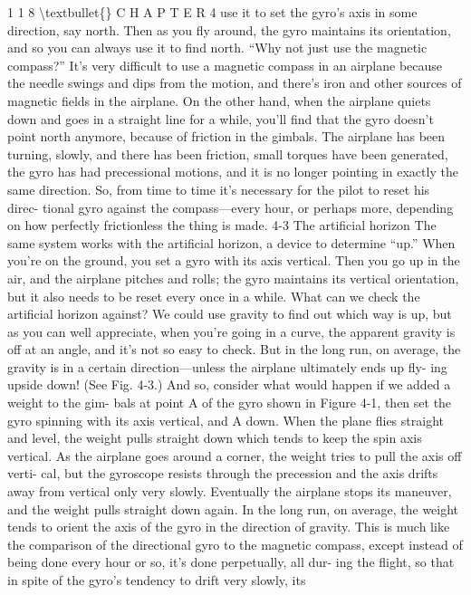\documentclass[10pt,oneside]{article}
\begin{document}
1 1 8 \textbackslash{}textbullet\{\} C H A P T E R  4 use it to set the gyro’s axis in some direction, say north. Then as you fly around, the gyro maintains its orientation, and so you can always use it to find north. “Why not just use the magnetic compass?” It’s very difficult to use a magnetic compass in an airplane because the needle swings and dips from the motion, and there’s iron and other sources of magnetic fields in the airplane. On the other hand, when the airplane quiets down and goes in a straight line for a while, you’ll find that the gyro doesn’t point north anymore, because of friction in the gimbals. The airplane has been turning, slowly, and there has been friction, small torques have been generated, the gyro has had precessional motions, and it is no longer pointing in exactly the same direction. So, from time to time it’s necessary for the pilot to reset his direc- tional gyro against the compass---every hour, or perhaps more, depending on how perfectly frictionless the thing is made. 4-3 The artificial horizon The same system works with the artificial horizon, a device to determine “up.” When you’re on the ground, you set a gyro with its axis vertical. Then you go up in the air, and the airplane pitches and rolls; the gyro maintains its vertical orientation, but it also needs to be reset every once in a while. What can we check the artificial horizon against? We could use gravity to find out which way is up, but as you can well appreciate, when you’re going in a curve, the apparent gravity is off at an angle, and it’s not so easy to check. But in the long run, on average, the gravity is in a certain direction---unless the airplane ultimately ends up fly- ing upside down! (See Fig. 4-3.) And so, consider what would happen if we added a weight to the gim- bals at point A of the gyro shown in Figure 4-1, then set the gyro spinning with its axis vertical, and A down. When the plane flies straight and level, the weight pulls straight down which tends to keep the spin axis vertical. As the airplane goes around a corner, the weight tries to pull the axis off verti- cal, but the gyroscope resists through the precession and the axis drifts away from vertical only very slowly. Eventually the airplane stops its maneuver, and the weight pulls straight down again. In the long run, on average, the weight tends to orient the axis of the gyro in the direction of gravity. This is much like the comparison of the directional gyro to the magnetic compass, except instead of being done every hour or so, it’s done perpetually, all dur- ing the flight, so that in spite of the gyro’s tendency to drift very slowly, its\par
\end{document}
